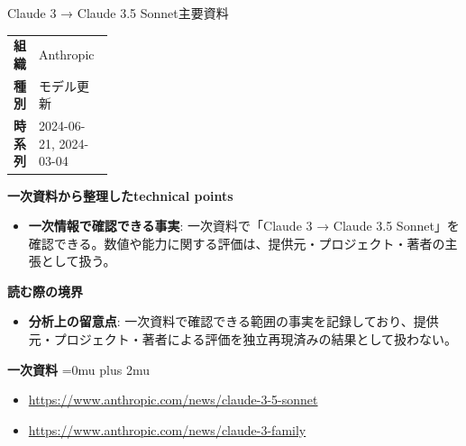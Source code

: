 \begin{technicalnote}{Claude 3 → Claude 3.5 Sonnet}{主要資料}
\begingroup
\begin{tabularx}{\linewidth}{@{}>{\bfseries}p{0.22\linewidth}X@{}}
組織 & Anthropic \\
種別 & モデル更新 \\
時系列 & 2024-06-21, 2024-03-04 \\
\end{tabularx}
\smallskip
{\bfseries 一次資料から整理したtechnical points}
\begin{itemize}[leftmargin=1.5em,itemsep=0.35em]
\item \textbf{一次情報で確認できる事実}: 一次資料で「Claude 3 → Claude 3.5 Sonnet」を確認できる。数値や能力に関する評価は、提供元・プロジェクト・著者の主張として扱う。
\end{itemize}
\begin{minipage}{\linewidth}
{\bfseries 読む際の境界}
\begin{itemize}[leftmargin=1.5em,itemsep=0.35em]
\item \textbf{分析上の留意点}: 一次資料で確認できる範囲の事実を記録しており、提供元・プロジェクト・著者による評価を独立再現済みの結果として扱わない。
\end{itemize}
\begin{samepage}
{\bfseries 一次資料}
\begingroup\sloppy
\Urlmuskip=0mu plus 2mu\relax
\begin{itemize}[leftmargin=1.5em,itemsep=0.25em]
\item {\scriptsize\url{https://www.anthropic.com/news/claude-3-5-sonnet}}
\item {\scriptsize\url{https://www.anthropic.com/news/claude-3-family}}
\end{itemize}
\endgroup
\end{samepage}
\end{minipage}
\endgroup
\end{technicalnote}
\medskip

